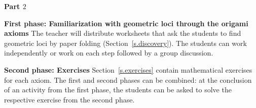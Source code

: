 \bigskip

\textbf{Part $2$}

\textbf{First phase: Familiarization with geometric loci through the origami axioms} The teacher will distribute worksheets that ask the students to find geometric loci by paper folding (Section~\ref{s.discovery}). The students can work independently or work on each step followed by a group discussion.

\textbf{Second phase: Exercises} Section~\ref{s.exercises} contain mathematical exercises for each axiom. The first and second phases can be combined: at the conclusion of an activity from the first phase, the students can be asked to solve the respective exercise from the second phase.
